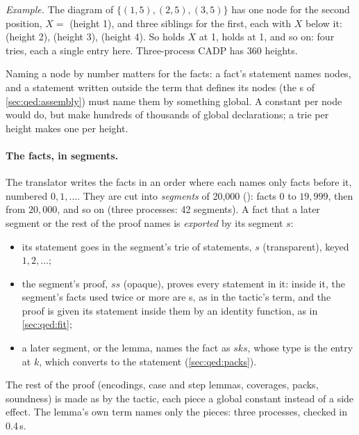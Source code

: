 \emph{Example.} The diagram of $\{(1,5), (2,5), (3,5)\}$ has one node
for the second position, $X = $  (height 1), and three
siblings for the first, each with $X$ below it:  (height
2),  (height 3), 
(height 4). So  holds $X$ at 1,  holds
 at 1, and so on: four tries, each a
single entry here. Three-process CADP has 360 heights.

Naming a node by number matters for the facts: a fact's statement names
nodes, and a statement written outside the term that defines its nodes
(the s of \cref{sec:qed:assembly}) must name them by something
global. A constant per node would do, but make hundreds of thousands of
global declarations; a trie per height makes one per height.

\paragraph{The facts, in segments.} The translator writes the facts in
an order where each names only facts before it, numbered $0, 1, \dots$.
They are cut into \emph{segments} of 20,000 ():
facts $0$ to $19{,}999$, then from $20{,}000$, and so on (three
processes: 42 segments). A fact that a later segment or the rest of the
proof names is \emph{exported} by its segment $s$:
\begin{itemize}
\item its statement goes in the segment's trie of statements,
  $s$ (transparent), keyed $1, 2, \dots$;
\item the segment's proof, $s$$s$
  (opaque), proves every statement in it: inside it, the segment's facts
  used twice or more are s, as in the tactic's term, and the
  proof is given its statement inside them by an identity function, as
  in \cref{sec:qed:fit};
\item a later segment, or the lemma, names the fact as
  $s$\code{ }$k$$s$, whose type is the
  entry at $k$, which converts to the statement (\cref{sec:qed:packs}).
\end{itemize}
The rest of the proof (encodings, case and step lemmas, coverages,
packs, soundness) is made as by the tactic, each piece a global constant
instead of a side effect. The lemma's own term names only the pieces:
three processes, checked in 0.4\,s.

